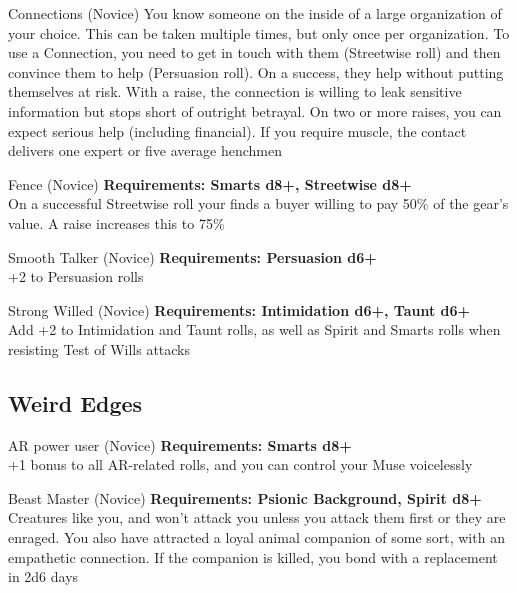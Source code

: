 \begin{multicols}{2}
\begin{genericsection}{Connections (Novice)}
You know someone on the inside of a large organization of your choice. This can be taken multiple times, but only once per organization. To use a Connection, you need to get in touch with them (Streetwise roll) and then convince them to help (Persuasion roll). On a success, they help without putting themselves at risk. With a raise, the connection is willing to leak sensitive information but stops short of outright betrayal. On two or more raises, you can expect serious help (including financial). If you require muscle, the contact delivers one expert or five average henchmen
\end{genericsection}

\begin{genericsection}{Fence (Novice)}
\textbf{Requirements: Smarts d8+, Streetwise d8+}\\
On a successful Streetwise roll your finds a buyer willing to pay 50\% of the gear’s value. A
raise increases this to 75\%
\end{genericsection}
 
\begin{genericsection}{Smooth Talker (Novice)}
\textbf{Requirements: Persuasion d6+}\\
+2 to Persuasion rolls
\end{genericsection}

\begin{genericsection}{Strong Willed (Novice)}
\textbf{Requirements: Intimidation d6+, Taunt d6+}\\
Add +2 to Intimidation and Taunt rolls, as well as Spirit and Smarts rolls when resisting Test of Wills attacks
\end{genericsection}

%
%
\subsection{Weird Edges}

\begin{genericsection}{AR power user (Novice)}
\textbf{Requirements: Smarts d8+}\\
+1 bonus to all AR-related rolls, and you can control your Muse voicelessly
\end{genericsection}

\begin{genericsection}{Beast Master (Novice)}
\textbf{Requirements: Psionic Background, Spirit d8+}\\
Creatures like you, and won't attack you unless you attack them first or they are enraged. You also have attracted a loyal animal companion of some sort, with an empathetic connection. If the companion is killed, you bond with a replacement in 2d6 days
\end{genericsection}


\end{multicols}
